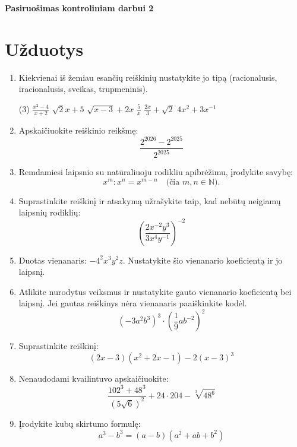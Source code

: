 \documentclass[12pt,a4paper]{article}
\begin{document}
\begin{center}
    {\Large \textbf{Pasiruošimas kontroliniam darbui 2}}\\[0.5cm]
\end{center}
\vspace{0.5cm}

\section*{Užduotys}

\begin{enumerate}
    \item Kiekvienai iš žemiau esančių reiškinių nustatykite jo tipą (racionalusis, iracionalusis, sveikas, trupmeninis).
    \begin{tasks}[label-width=1.2em](3)
        \task $\frac{x^2 - 4}{x+2}$
        \task $\sqrt{2}x + 5$
        \task $\sqrt{x-3} + 2x$
        \task $\frac{5}{x}$
        \task $\frac{2x}{3}+ \sqrt{2}$
        \task $4x ^{2} +3x ^{-1} $
    \end{tasks}

    \item Apskaičiuokite reiškinio reikšmę:
    $$\frac{2^{2026} - 2^{2025}}{2^{2025}}$$

    \item Remdamiesi laipsnio su natūraliuoju rodikliu apibrėžimu, įrodykite savybę: 
    $$x^m : x^n = x^{m-n} \quad \text{(čia $m, n \in \mathbb{N}$)}.$$
    \item Suprastinkite reiškinį ir atsakymą užrašykite taip, kad nebūtų neigiamų laipsnių rodiklių:
    $$ \left(\frac{2x^{-2}y^3}{3x^4y^{-1}}\right)^{-2}$$
    \item Duotas vienanaris: $-4^2 x^3 y^2 z$. Nustatykite šio vienanario koeficientą ir jo laipsnį.

    \item Atlikite nurodytus veiksmus ir nustatykite gauto vienanario koeficientą bei laipsnį. Jei gautas reiškinys nėra vienanaris paaiškinkite kodėl.
    $$(-3a^2b^3)^3 \cdot \left(\frac{1}{9}ab^{-2}\right)^2$$

    \item Suprastinkite reiškinį:
    $$ (2x - 3)(x^2 + 2x - 1) - 2(x-3) ^{3}  $$

    \item Nenaudodami kvailintuvo apskaičiuokite: $$ \frac{102^3 + 48^3}{(5 \sqrt{6} ) ^{2}  } +24 \cdot 204- \sqrt[3]{48 ^{6} } $$  

    \item Įrodykite kubų skirtumo formulę:
    $$ a^3 - b^3 = (a - b)(a^2 + ab + b^2) $$


\end{enumerate}
\end{document}
